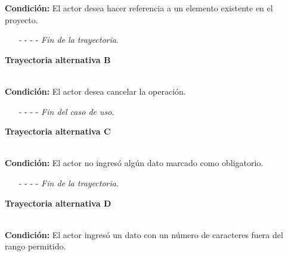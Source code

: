 \noindent \textbf{Condición:} El actor desea hacer referencia a un elemento existente en el proyecto.
\begin{enumerate}
	\UCpaso[\UCactor] Ingresa el token correspondiente al elemento a referenciar.
	\UCpaso[\UCsist] Verifica que los tokens utilizados se encuentren correctamente estructurados, con base en la regla de negocio .
	\UCpaso[\UCsist] Obtiene los elementos registrados en el proyecto correspondientes al token ingresado. 
	\UCpaso[\UCsist] Muestra una lista con los elementos encontrados.
	\UCpaso[\UCactor] Selecciona un elemento de la lista.
	\UCpaso[\UCsist] Verifica que el nombre del elemento seleccionado no contenga espacios. \hyperlink{CU12-2:TAH}{[Trayectoria H]}
	\UCpaso[\UCsist] Agrega la referencia del elemento al texto. \label{CU12.2-TA1}
	\UCpaso Continúa en el paso \ref{CU12.2-P7} de la trayectoria principal.
	\item[- -] - - {\em {Fin de la trayectoria}}.%
\end{enumerate}
\hypertarget{CU12-2:TAB}{\textbf{Trayectoria alternativa B}}\\
\noindent \textbf{Condición:} El actor desea cancelar la operación.
\begin{enumerate}
	\UCpaso[\UCactor] Solicita cancelar la operación oprimiendo el botón  de la pantalla .
	\UCpaso[\UCsist] Muestra la pantalla .
	\item[- -] - - {\em {Fin del caso de uso}}.%
\end{enumerate}
\hypertarget{CU12-2:TAC}{\textbf{Trayectoria alternativa C}}\\
\noindent \textbf{Condición:} El actor no ingresó algún dato marcado como obligatorio.
\begin{enumerate}
	\UCpaso[\UCsist] Muestra el mensaje  señalando el campo que presenta el error en la pantalla .
	\UCpaso Regresa al paso \ref{CU12.2-P6} de la trayectoria principal.
	\item[- -] - - {\em {Fin de la trayectoria}}.%
\end{enumerate}
\hypertarget{CU12-2:TAD}{\textbf{Trayectoria alternativa D}}\\
\noindent \textbf{Condición:} El actor ingresó un dato con un número de caracteres fuera del rango permitido.
